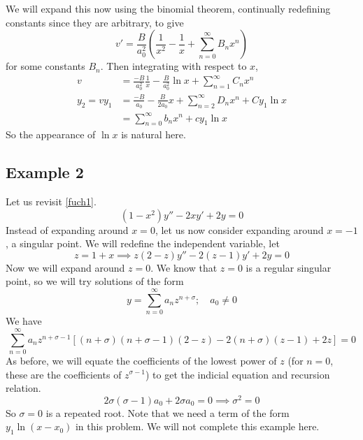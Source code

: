 \begin{itemize}
	      We will expand this now using the binomial theorem, continually redefining constants since they are arbitrary, to give
	      \[
		      v' = \frac{B}{a_0^2}\left( \frac{1}{x^2} - \frac{1}{x} + \sum_{n=0}^\infty B_n x^n \right)
	      \]
	      for some constants \(B_n\).
	      Then integrating with respect to \(x\),
	      \begin{align*}
		      v          & = \frac{-B}{a_0^2}\frac{1}{x} - \frac{B}{a_0^2}\ln x + \sum_{n=1}^\infty C_n x^n \\
		      y_2 = vy_1 & = \frac{-B}{a_0} - \frac{B}{2a_0}x + \sum_{n=2}^\infty D_n x^n + Cy_1\ln x       \\
		                 & = \sum_{n=0}^\infty b_nx^n + cy_1\ln x
	      \end{align*}
	      So the appearance of \(\ln x\) is natural here.
\end{itemize}

\subsection{Example 2}
Let us revisit \eqref{fuch1}.
\[
	(1-x^2)y'' - 2xy' + 2y = 0
\]
Instead of expanding around \(x=0\), let us now consider expanding around \(x=-1\), a singular point.
We will redefine the independent variable, let
\[
	z = 1 + x \implies z(2-z)y'' - 2(z-1)y' + 2y = 0
\]
Now we will expand around \(z=0\).
We know that \(z=0\) is a regular singular point, so we will try solutions of the form
\[
	y = \sum_{n=0}^\infty a_nz^{n+\sigma};\quad a_0 \neq 0
\]
We have
\[
	\sum_{n=0}^\infty a_nz^{n+\sigma-1}\left[ (n+\sigma)(n+\sigma-1)(2-z) - 2(n+\sigma)(z-1) + 2z \right] = 0
\]
As before, we will equate the coefficients of the lowest power of \(z\) (for \(n=0\), these are the coefficients of \(z^{\sigma - 1}\)) to get the indicial equation and recursion relation.
\[
	2\sigma(\sigma - 1)a_0 + 2\sigma a_0 = 0 \implies \sigma^2 = 0
\]
So \(\sigma = 0\) is a repeated root.
Note that we need a term of the form \(y_1\ln (x-x_0)\) in this problem.
We will not complete this example here.
